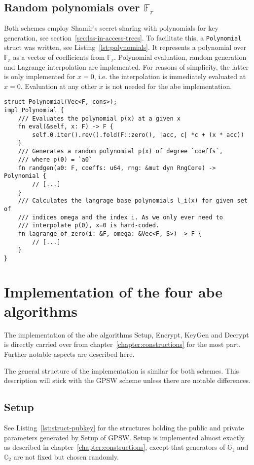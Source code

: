 \subsection{Random polynomials over $\mathbb{F}_r$}

Both schemes employ Shamir's secret sharing with polynomials for key generation, see section~\ref{sec:lss-in-access-trees}.
To facilitate this, a \texttt{Polynomial} struct was written, see Listing~\ref{lst:polynomials}.
It represents a polynomial over $\mathbb{F}_r$ as a vector of coefficients from $\mathbb{F}_r$.
Polynomial evaluation, random generation and Lagrange interpolation are implemented.
For reasons of simplicity, the latter is only implemented for $x=0$, i.e. the interpolation is immediately evaluated at $x=0$.
Evaluation at any other $x$ is not needed for the \acrshort{abe} implementation.

\begin{lstlisting}[float=h,caption={Implementation of polynomials over $\mathbb{F}_r$},label={lst:polynomials}]
struct Polynomial(Vec<F, cons>);
impl Polynomial {
    /// Evaluates the polynomial p(x) at a given x
    fn eval(&self, x: F) -> F {
        self.0.iter().rev().fold(F::zero(), |acc, c| *c + (x * acc))
    }
    /// Generates a random polynomial p(x) of degree `coeffs`,
    /// where p(0) = `a0`
    fn randgen(a0: F, coeffs: u64, rng: &mut dyn RngCore) -> Polynomial {
        // [...]
    }
    /// Calculates the langrage base polynomials l_i(x) for given set of
    /// indices omega and the index i. As we only ever need to
    /// interpolate p(0), x=0 is hard-coded.
    fn lagrange_of_zero(i: &F, omega: &Vec<F, S>) -> F {
        // [...]
    }
}
\end{lstlisting}

\section{Implementation of the four \acrshort*{abe} algorithms}\label{sec:abe-algs-impl}

The implementation of the \acrshort{abe} algorithms Setup, Encrypt, KeyGen and Decrypt is directly carried over from chapter~\ref{chapter:constructions} for the most part.
Further notable aspects are described here.

The general structure of the implementation is similar for both schemes. 
This description will stick with the GPSW scheme unless there are notable differences.

\subsection{Setup}
See Listing~\ref{lst:struct-pubkey} for the structures holding the public and private parameters generated by Setup of GPSW.
Setup is implemented almost exactly as described in chapter~\ref{chapter:constructions}, except that generators of $\mathbb{G}_1$ and $\mathbb{G}_2$ are not fixed but chosen randomly.

